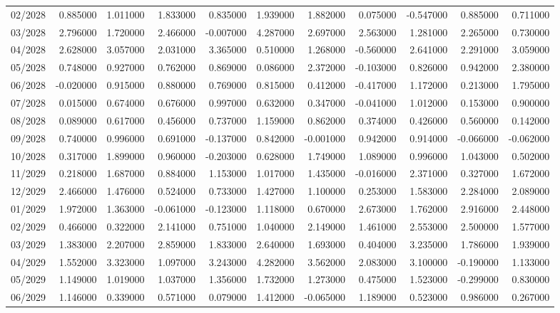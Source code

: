 \begin{tabular}{lrrrrrrrrrr}
02/2028 & 0.885000 & 1.011000 & 1.833000 & 0.835000 & 1.939000 & 1.882000 & 0.075000 & -0.547000 & 0.885000 & 0.711000 \\
03/2028 & 2.796000 & 1.720000 & 2.466000 & -0.007000 & 4.287000 & 2.697000 & 2.563000 & 1.281000 & 2.265000 & 0.730000 \\
04/2028 & 2.628000 & 3.057000 & 2.031000 & 3.365000 & 0.510000 & 1.268000 & -0.560000 & 2.641000 & 2.291000 & 3.059000 \\
05/2028 & 0.748000 & 0.927000 & 0.762000 & 0.869000 & 0.086000 & 2.372000 & -0.103000 & 0.826000 & 0.942000 & 2.380000 \\
06/2028 & -0.020000 & 0.915000 & 0.880000 & 0.769000 & 0.815000 & 0.412000 & -0.417000 & 1.172000 & 0.213000 & 1.795000 \\
07/2028 & 0.015000 & 0.674000 & 0.676000 & 0.997000 & 0.632000 & 0.347000 & -0.041000 & 1.012000 & 0.153000 & 0.900000 \\
08/2028 & 0.089000 & 0.617000 & 0.456000 & 0.737000 & 1.159000 & 0.862000 & 0.374000 & 0.426000 & 0.560000 & 0.142000 \\
09/2028 & 0.740000 & 0.996000 & 0.691000 & -0.137000 & 0.842000 & -0.001000 & 0.942000 & 0.914000 & -0.066000 & -0.062000 \\
10/2028 & 0.317000 & 1.899000 & 0.960000 & -0.203000 & 0.628000 & 1.749000 & 1.089000 & 0.996000 & 1.043000 & 0.502000 \\
11/2029 & 0.218000 & 1.687000 & 0.884000 & 1.153000 & 1.017000 & 1.435000 & -0.016000 & 2.371000 & 0.327000 & 1.672000 \\
12/2029 & 2.466000 & 1.476000 & 0.524000 & 0.733000 & 1.427000 & 1.100000 & 0.253000 & 1.583000 & 2.284000 & 2.089000 \\
01/2029 & 1.972000 & 1.363000 & -0.061000 & -0.123000 & 1.118000 & 0.670000 & 2.673000 & 1.762000 & 2.916000 & 2.448000 \\
02/2029 & 0.466000 & 0.322000 & 2.141000 & 0.751000 & 1.040000 & 2.149000 & 1.461000 & 2.553000 & 2.500000 & 1.577000 \\
03/2029 & 1.383000 & 2.207000 & 2.859000 & 1.833000 & 2.640000 & 1.693000 & 0.404000 & 3.235000 & 1.786000 & 1.939000 \\
04/2029 & 1.552000 & 3.323000 & 1.097000 & 3.243000 & 4.282000 & 3.562000 & 2.083000 & 3.100000 & -0.190000 & 1.133000 \\
05/2029 & 1.149000 & 1.019000 & 1.037000 & 1.356000 & 1.732000 & 1.273000 & 0.475000 & 1.523000 & -0.299000 & 0.830000 \\
06/2029 & 1.146000 & 0.339000 & 0.571000 & 0.079000 & 1.412000 & -0.065000 & 1.189000 & 0.523000 & 0.986000 & 0.267000 \\

\end{tabular}
